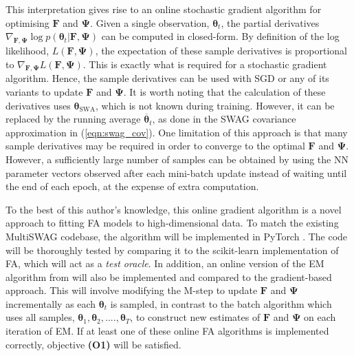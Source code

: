 \documentclass[a4paper,11pt]{article}
\newcommand{\matr}[1]{\mathbf{#1}}
\newcommand{\bgreek}[1]{\boldsymbol{#1}}
\begin{document}
This interpretation gives rise to an online stochastic gradient algorithm for optimising $\matr{F}$ and $\matr{\Psi}$. Given a single observation, $\bgreek{\theta}_t$, the partial derivatives $\nabla_{\matr{F}, \matr{\Psi}} \log p(\bgreek{\theta}_t | \matr{F}, \matr{\Psi})$ can be computed in closed-form. By definition of the log likelihood, $L(\matr{F}, \matr{\Psi})$, the expectation of these sample derivatives is proportional to $\nabla_{\matr{F}, \matr{\Psi}} L(\matr{F}, \matr{\Psi})$. This is exactly what is required for a stochastic gradient algorithm. Hence, the sample derivatives can be used with SGD or any of its variants to update $\matr{F}$ and $\matr{\Psi}$. It is worth noting that the calculation of these derivatives uses $\bgreek{\theta}_{\text{SWA}}$, which is not known during training. However, it can be replaced by the running average $\overline{\bgreek{\theta}}_t$, as done in the SWAG covariance approximation in (\ref{eqn:swag_cov}). One limitation of this approach is that many sample derivatives may be required in order to converge to the optimal $\matr{F}$ and $\matr{\Psi}$. However, a sufficiently large number of samples can be obtained by using the NN parameter vectors observed after each mini-batch update instead of waiting until the end of each epoch, at the expense of extra computation. 

To the best of this author's knowledge, this online gradient algorithm is a novel approach to fitting FA models to high-dimensional data. 
To match the existing MultiSWAG codebase, the algorithm will be implemented in PyTorch \cite{paszke2019}. The code will be thoroughly tested by comparing it to the scikit-learn \cite{pedregosa2012} implementation of FA, which will act as a \emph{test oracle}. In addition, an online version of the  EM algorithm from \cite{barber2007} will also be implemented and compared to the gradient-based approach. This will involve modifying the M-step to update $\matr{F}$ and $\matr{\Psi}$ incrementally as each $\bgreek{\theta}_t$ is sampled, in contrast to the batch algorithm which uses all samples, $\bgreek{\theta}_1, \bgreek{\theta}_2, ...., \bgreek{\theta}_T$, to construct new estimates of $\matr{F}$ and $\matr{\Psi}$ on each iteration of EM. If at least one of these online FA algorithms is implemented correctly, objective \textbf{(O1)} will be satisfied.
\end{document}
